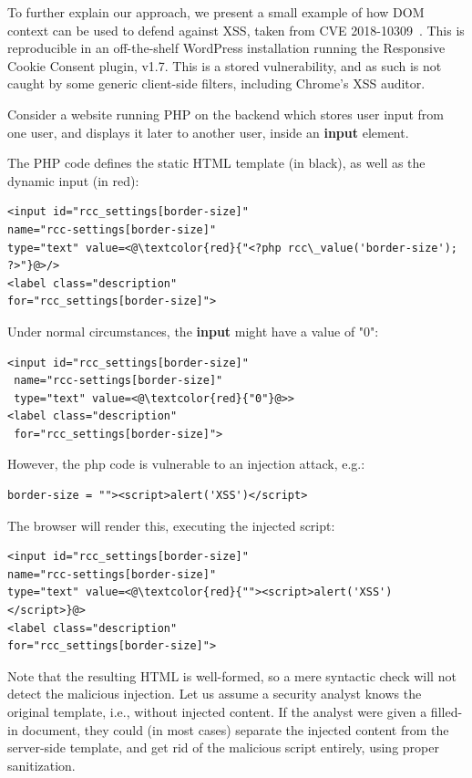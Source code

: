 To further explain our approach, we present a small example of how
DOM context can be used to defend against XSS, taken from CVE
2018-10309~\cite{examplecve}. This is reproducible in an off-the-shelf
WordPress installation running the Responsive Cookie Consent plugin,
v1.7. This is a stored \xss vulnerability, and as such is not caught
by some generic client-side \xss filters, including Chrome's XSS auditor.

Consider a website running PHP on the backend which stores user input
from one user, and displays it later to another user, inside an \textbf{input} element.

The PHP code defines the static HTML template (in black), as well as the dynamic input (in red):

\begin{lstlisting}
<input id="rcc_settings[border-size]" 
name="rcc-settings[border-size]" 
type="text" value=<@\textcolor{red}{"<?php rcc\_value('border-size'); ?>"}@>/>
<label class="description"
for="rcc_settings[border-size]">
\end{lstlisting}
Under normal circumstances, the \textbf{input} might have a value of "0":
\begin{lstlisting}
<input id="rcc_settings[border-size]" 
 name="rcc-settings[border-size]" 
 type="text" value=<@\textcolor{red}{"0"}@>>
<label class="description"
 for="rcc_settings[border-size]">
\end{lstlisting}
However, the php code is vulnerable to an injection attack, e.g.:
\begin{lstlisting}
border-size = ""><script>alert('XSS')</script>
\end{lstlisting}
The browser will render this, executing the injected script:
\begin{lstlisting}
<input id="rcc_settings[border-size]" 
name="rcc-settings[border-size]" 
type="text" value=<@\textcolor{red}{""><script>alert('XSS')</script>}@>
<label class="description"
for="rcc_settings[border-size]">
\end{lstlisting}

Note that the resulting HTML is well-formed, so a mere syntactic check
will not detect the malicious injection. Let us assume a security
analyst knows the original template, i.e., without injected
content. If the analyst were given a filled-in document, they could
(in most cases) separate the injected content from the server-side
template, and get rid of the malicious script entirely, using proper sanitization. %

